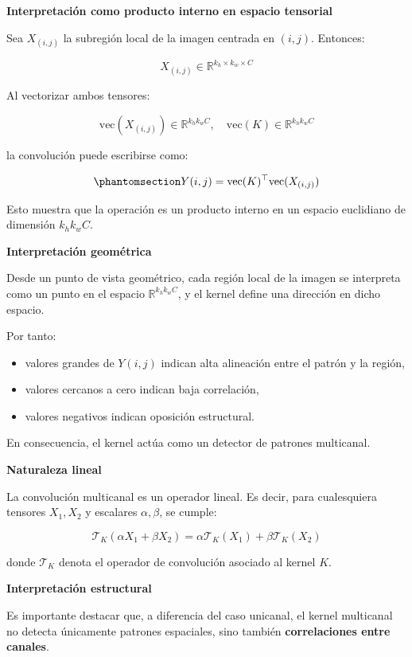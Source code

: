 \documentclass[
  spanish,
  us-letterpaper,
  DIV=11,
  numbers=noendperiod]{scrreprt}
\providecommand{\tightlist}{%
  \setlength{\itemsep}{0pt}\setlength{\parskip}{0pt}}
\begin{document}
\textbf{Interpretación como producto interno en espacio tensorial}

Sea \(X_{(i,j)}\) la subregión local de la imagen centrada en \((i,j)\).
Entonces:

\[
X_{(i,j)} \in \mathbb{R}^{k_h \times k_w \times C}
\]

Al vectorizar ambos tensores:

\[
\mathrm{vec}(X_{(i,j)}) \in \mathbb{R}^{k_h k_w C}, \quad
\mathrm{vec}(K) \in \mathbb{R}^{k_h k_w C}
\]

la convolución puede escribirse como:

\begin{equation}\phantomsection\label{eq-vectorizacion}{
Y(i,j) = \mathrm{vec}(K)^\top \mathrm{vec}(X_{(i,j)})
}\end{equation}

Esto muestra que la operación es un producto interno en un espacio
euclidiano de dimensión \(k_h k_w C\).

\textbf{Interpretación geométrica}

Desde un punto de vista geométrico, cada región local de la imagen se
interpreta como un punto en el espacio \(\mathbb{R}^{k_h k_w C}\), y el
kernel define una dirección en dicho espacio.

Por tanto:

\begin{itemize}
\tightlist
\item
  valores grandes de \(Y(i,j)\) indican alta alineación entre el patrón
  y la región,
\item
  valores cercanos a cero indican baja correlación,
\item
  valores negativos indican oposición estructural.
\end{itemize}

En consecuencia, el kernel actúa como un detector de patrones
multicanal.

\textbf{Naturaleza lineal}

La convolución multicanal es un operador lineal. Es decir, para
cualesquiera tensores \(X_1, X_2\) y escalares \(\alpha, \beta\), se
cumple:

\[
\mathcal{T}_K(\alpha X_1 + \beta X_2)
=
\alpha \mathcal{T}_K(X_1) + \beta \mathcal{T}_K(X_2)
\]

donde \(\mathcal{T}_K\) denota el operador de convolución asociado al
kernel \(K\).

\textbf{Interpretación estructural}

Es importante destacar que, a diferencia del caso unicanal, el kernel
multicanal no detecta únicamente patrones espaciales, sino también
\textbf{correlaciones entre canales}.
\end{document}
